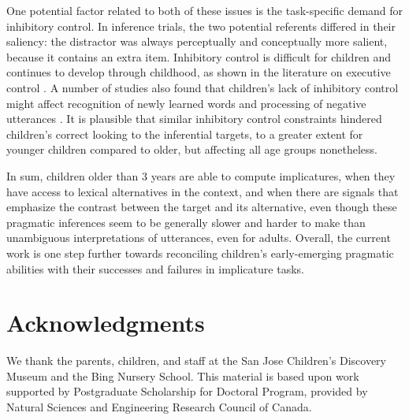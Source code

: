 \documentclass[10pt,letterpaper]{article}
\begin{document}
One potential factor related to both of these issues is the task-specific demand for inhibitory control. In inference trials, the two potential referents differed in their saliency: the distractor was always perceptually and conceptually more salient, because it contains an extra item. Inhibitory control is difficult for children and continues to develop through childhood, as shown in the literature on executive control \cite{davidson2006development, gerardi2000sensitivity}. A number of studies also found that children's lack of inhibitory control might affect recognition of newly learned words \cite{yurovskybeyond} and processing of negative utterances \cite{nordmeyer2013measuring}. It is plausible that similar inhibitory control constraints hindered children's correct looking to the inferential targets, to a greater extent for younger children compared to older, but affecting all age groups nonetheless. 

In sum, children older than 3 years are able to compute implicatures, when they have access to lexical alternatives in the context, and when there are signals that emphasize the contrast between the target and its alternative, even though these pragmatic inferences seem to be generally slower and harder to make than unambiguous interpretations of utterances, even for adults. Overall, the current work is one step further towards reconciling children's early-emerging pragmatic abilities with their successes and failures in implicature tasks.

\section{Acknowledgments}

We thank the parents, children, and staff at the San Jose Children's Discovery Museum and the Bing Nursery School. This material is based upon work supported by Postgraduate Scholarship for Doctoral Program, provided by Natural Sciences and Engineering Research Council of Canada.





\setlength{\bibleftmargin}{.125in}
\setlength{\bibindent}{-\bibleftmargin}


\end{document}
